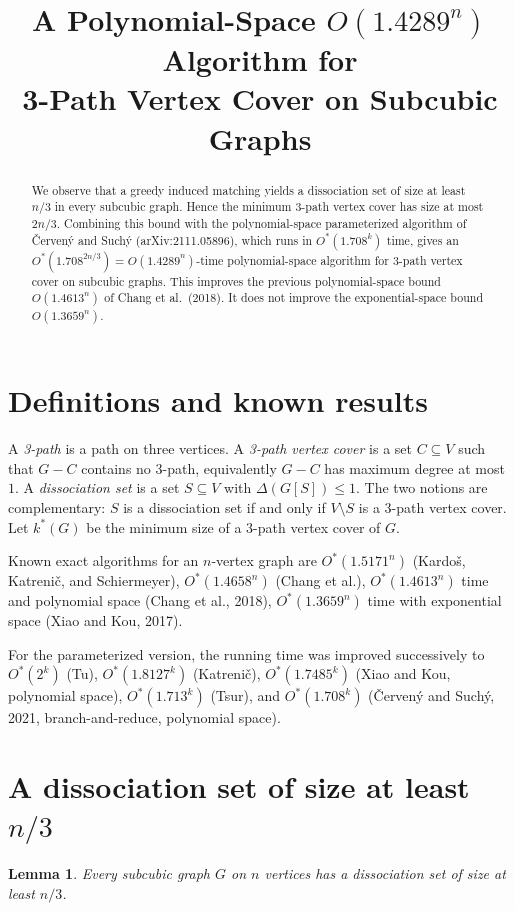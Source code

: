 \documentclass[11pt]{article}
\title{A Polynomial-Space $O(1.4289^n)$ Algorithm for\\ 3-Path Vertex Cover on Subcubic Graphs}
\author{}
\date{}
\newtheorem{lemma}{Lemma}
\begin{document}
\maketitle

\begin{abstract}
We observe that a greedy induced matching yields a dissociation set of size at least
$n/3$ in every subcubic graph. Hence the minimum 3-path vertex cover has size at most
$2n/3$. Combining this bound with the polynomial-space parameterized algorithm of
\v{C}erven\'y and Such\'y (arXiv:2111.05896), which runs in $O^*(1.708^k)$ time, gives
an $O^*(1.708^{2n/3}) = O(1.4289^n)$-time polynomial-space algorithm for 3-path vertex
cover on subcubic graphs. This improves the previous polynomial-space bound
$O(1.4613^n)$ of Chang et al.\ (2018). It does not improve the exponential-space bound
$O(1.3659^n)$.
\end{abstract}

\section{Definitions and known results}

A \emph{3-path} is a path on three vertices. A \emph{3-path vertex cover} is a set
$C \subseteq V$ such that $G-C$ contains no 3-path, equivalently $G-C$ has maximum
degree at most $1$. A \emph{dissociation set} is a set $S \subseteq V$ with
$\Delta(G[S]) \le 1$. The two notions are complementary: $S$ is a dissociation set if
and only if $V \setminus S$ is a 3-path vertex cover. Let $k^*(G)$ be the minimum size
of a 3-path vertex cover of $G$.

Known exact algorithms for an $n$-vertex graph are
$O^*(1.5171^n)$ (Kardoš, Katrenič, and Schiermeyer),
$O^*(1.4658^n)$ (Chang et al.),
$O^*(1.4613^n)$ time and polynomial space (Chang et al., 2018),
$O^*(1.3659^n)$ time with exponential space (Xiao and Kou, 2017).

For the parameterized version, the running time was improved successively to
$O^*(2^k)$ (Tu), $O^*(1.8127^k)$ (Katrenič), $O^*(1.7485^k)$ (Xiao and Kou, polynomial
space), $O^*(1.713^k)$ (Tsur), and $O^*(1.708^k)$ (\v{C}erven\'y and Such\'y, 2021,
branch-and-reduce, polynomial space).

\section{A dissociation set of size at least $n/3$}

\begin{lemma}
Every subcubic graph $G$ on $n$ vertices has a dissociation set of size at least
$n/3$.
\end{lemma}
\end{document}
